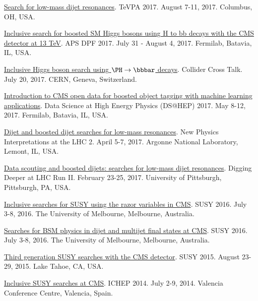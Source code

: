 \documentclass[11pt]{res}
\newif\ifext
\newenvironment{extended}{\ifext}{\fi}
\begin{document}
\begin{resume}
  \href{https://indico.cern.ch/event/615891/contributions/2666361/}{Search for low-mass dijet resonances}. TeVPA 2017. August 7-11, 2017. Columbus, OH, USA.

  \href{https://indico.fnal.gov/contributionDisplay.py?sessionId=14&contribId=38&confId=11999}{Inclusive search for boosted SM Higgs bosons using H to bb decays with the CMS detector at 13 TeV}. APS DPF 2017. July 31 - August 4, 2017. Fermilab, Batavia, IL, USA.

  \href{https://indico.cern.ch/event/649575/}{Inclusive Higgs boson search using $\PH\to\bbbar$ decays}. Collider Cross Talk. July 20, 2017. CERN, Geneva, Switzerland.

  \href{https://indico.fnal.gov/contributionDisplay.py?sessionId=6&contribId=54&confId=13497}{Introduction to CMS open data for boosted object tagging with machine learning applications}. Data Science at High Energy Physics (DS@HEP) 2017. May 8-12, 2017. Fermilab, Batavia, IL, USA.

  \begin{extended}

    \href{https://indico.cern.ch/event/540843/contributions/2464658/}{Dijet and boosted dijet searches for low-mass resonances}. New Physics Interpretations at the LHC 2. April 5-7, 2017. Argonne National Laboratory, Lemont, IL, USA.

    \href{https://indico.cern.ch/event/592671/contributions/2401900/}{Data scouting and boosted dijets: searches for low-mass dijet resonances}. Digging Deeper at LHC Run II. February 23-25, 2017. University of Pittsburgh, Pittsburgh, PA, USA.

    \href{https://indico.cern.ch/event/443176/contributions/2148316/}{Inclusive searches for SUSY using the razor variables in CMS}. SUSY 2016. July 3-8, 2016. The University of Melbourne, Melbourne, Australia.

    \href{https://indico.cern.ch/event/443176/contributions/2154549/}{Searches for BSM physics in dijet and multijet final states at CMS}. SUSY 2016. July 3-8, 2016. The University of Melbourne, Melbourne, Australia.

    \href{https://indico.cern.ch/event/331032/contributions/1720249/}{Third generation SUSY searches with the CMS detector}. SUSY 2015. August 23-29, 2015. Lake Tahoe, CA, USA.

    \href{https://indico.ific.uv.es/indico/contributionDisplay.py?sessionId=24&contribId=289&confId=2025}{Inclusive SUSY searches at CMS}. ICHEP 2014. July 2-9, 2014. Valencia Conference Centre, Valencia, Spain.


\end{extended}
\end{resume}
\end{document}
